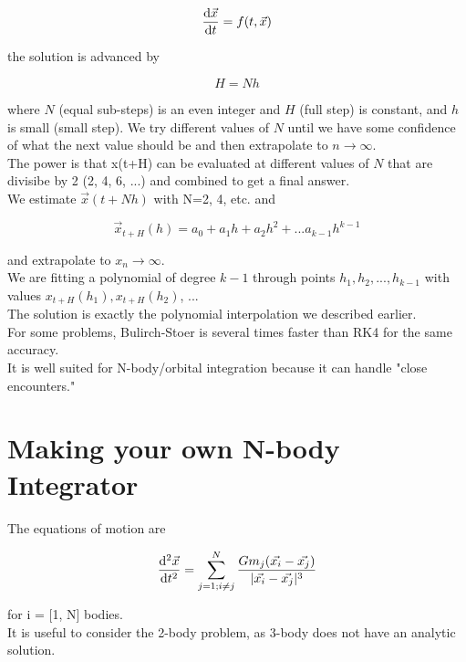 \documentclass[]{article}
\begin{document}
\[\dv{\vec{x}}{t} = f(t, \vec{x}) \]

the solution is advanced by

\[H = Nh\]

where $N$ (equal sub-steps) is an even integer and $H$ (full step) is constant, and $h$ is small (small step). We try different values of $N$ until we have some confidence of what the next value should be and then extrapolate to $n \to \infty$.\\

The power is that x(t+H) can be evaluated at different values of $N$ that are divisibe by 2 (2, 4, 6, ...) and combined to get a final answer. \\

We estimate $\vec{x}(t+Nh)$ with N=2, 4, etc. and 

\[\vec{x}_{t+H}(h) = a_0 + a_1h + a_2h^2 + ... a_{k-1}h^{k-1}\]

and extrapolate to $x_n \to \infty$.\\

We are fitting a polynomial of degree $k-1$ through points $h_1, h_2, ..., h_{k-1}$ with values $x_{t+H}(h_1), x_{t+H}(h_2)$, ...\\

The solution is exactly the polynomial interpolation we described earlier.\\


For some problems, Bulirch-Stoer is several times faster than RK4 for the same accuracy.\\

It is well suited for N-body/orbital integration because it can handle "close encounters."\\

\section{Making your own N-body Integrator}\bigbreak\bigbreak

The equations of motion are

\[\dv[2]{\vec{x}}{t} = \sum_{j=1; i\neq j}^{N}\frac{Gm_j(\vec{x_i} - \vec{x_j})}{|\vec{x_i} - \vec{x_j}|^3}\]

for i = [1, N] bodies.\\

It is useful to consider the 2-body problem, as 3-body does not have an analytic solution.\\
\end{document}
